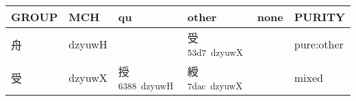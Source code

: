 \documentclass[14pt,a4paper]{scrartcl}
\begin{document}
\begin{longtable}[c]{@{}llllll@{}}
\toprule
\begin{minipage}[b]{0.14\columnwidth}\raggedright\strut
GROUP
\strut\end{minipage} &
\begin{minipage}[b]{0.14\columnwidth}\raggedright\strut
MCH
\strut\end{minipage} &
\begin{minipage}[b]{0.14\columnwidth}\raggedright\strut
qu
\strut\end{minipage} &
\begin{minipage}[b]{0.14\columnwidth}\raggedright\strut
other
\strut\end{minipage} &
\begin{minipage}[b]{0.14\columnwidth}\raggedright\strut
none
\strut\end{minipage} &
\begin{minipage}[b]{0.14\columnwidth}\raggedright\strut
PURITY
\strut\end{minipage}\tabularnewline
\midrule
\endhead
\begin{minipage}[t]{0.14\columnwidth}\raggedright\strut
舟
\strut\end{minipage} &
\begin{minipage}[t]{0.14\columnwidth}\raggedright\strut
dzyuwH
\strut\end{minipage} &
\begin{minipage}[t]{0.14\columnwidth}\raggedright\strut
\strut\end{minipage} &
\begin{minipage}[t]{0.14\columnwidth}\raggedright\strut
受\textsuperscript{53d7~dzyuwX}
\strut\end{minipage} &
\begin{minipage}[t]{0.14\columnwidth}\raggedright\strut
\strut\end{minipage} &
\begin{minipage}[t]{0.14\columnwidth}\raggedright\strut
pure:other
\strut\end{minipage}\tabularnewline
\begin{minipage}[t]{0.14\columnwidth}\raggedright\strut
受
\strut\end{minipage} &
\begin{minipage}[t]{0.14\columnwidth}\raggedright\strut
dzyuwX
\strut\end{minipage} &
\begin{minipage}[t]{0.14\columnwidth}\raggedright\strut
授\textsuperscript{6388~dzyuwH}
\strut\end{minipage} &
\begin{minipage}[t]{0.14\columnwidth}\raggedright\strut
綬\textsuperscript{7dac~dzyuwX}
\strut\end{minipage} &
\begin{minipage}[t]{0.14\columnwidth}\raggedright\strut
\strut\end{minipage} &
\begin{minipage}[t]{0.14\columnwidth}\raggedright\strut
mixed
\strut\end{minipage}\tabularnewline
\bottomrule
\end{longtable}
\end{document}
